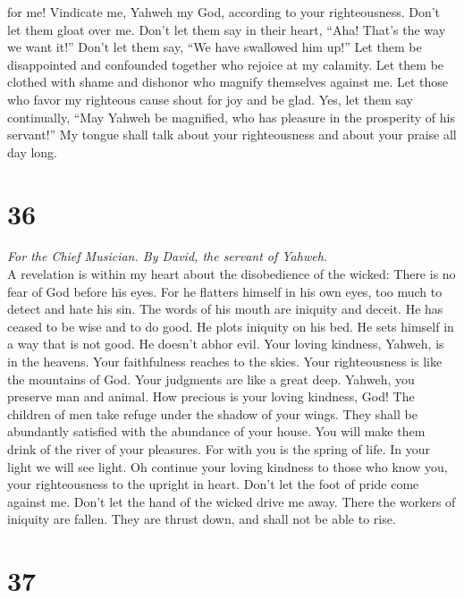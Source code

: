 for me!  Vindicate me, Yahweh my God, according to your
righteousness. Don't let them gloat over me.  Don't let
them say in their heart, ``Aha! That's the way we want it!'' Don't let
them say, ``We have swallowed him up!''  Let them be
disappointed and confounded together who rejoice at my calamity. Let
them be clothed with shame and dishonor who magnify themselves against
me.  Let those who favor my righteous cause shout for joy
and be glad. Yes, let them say continually, ``May Yahweh be magnified,
who has pleasure in the prosperity of his servant!''  My
tongue shall talk about your righteousness and about your praise all day
long.

\hypertarget{section-35}{%
\section{36}\label{section-35}}

\emph{For the Chief Musician. By David, the servant of Yahweh.}\\
 A revelation is within my heart about the disobedience of
the wicked: There is no fear of God before his eyes.  For
he flatters himself in his own eyes, too much to detect and hate his
sin.  The words of his mouth are iniquity and deceit. He
has ceased to be wise and to do good.  He plots iniquity
on his bed. He sets himself in a way that is not good. He doesn't abhor
evil.  Your loving kindness, Yahweh, is in the heavens.
Your faithfulness reaches to the skies.  Your
righteousness is like the mountains of God. Your judgments are like a
great deep. Yahweh, you preserve man and animal.  How
precious is your loving kindness, God! The children of men take refuge
under the shadow of your wings.  They shall be abundantly
satisfied with the abundance of your house. You will make them drink of
the river of your pleasures.  For with you is the spring
of life. In your light we will see light.  Oh continue
your loving kindness to those who know you, your righteousness to the
upright in heart.  Don't let the foot of pride come
against me. Don't let the hand of the wicked drive me away.
 There the workers of iniquity are fallen. They are
thrust down, and shall not be able to rise.

\hypertarget{section-36}{%
\section{37}\label{section-36}}

